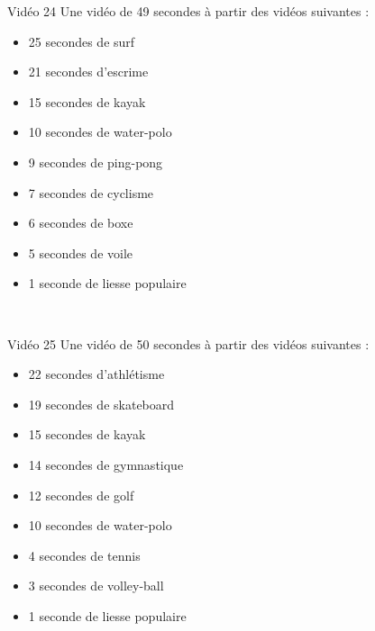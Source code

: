 \documentclass[10pt, a5paper,twoside]{article}
\begin{document}
\vfill

\begin{card}[width = \textwidth, colback = olympicyellow, colframe = olympicyellow, bottomtitle = 2mm]{Vidéo 24}
  Une vidéo de 49 secondes à partir des vidéos suivantes :
  \vspace{-1mm}\begin{itemize}
    \item 25 secondes de surf
    \item 21 secondes d'escrime
    \item 15 secondes de kayak
    \item 10 secondes de water-polo
    \item 9 secondes de ping-pong
    \item 7 secondes de cyclisme
    \item 6 secondes de boxe
    \item 5 secondes de voile
    \item 1 seconde de liesse populaire
  \end{itemize}
\end{card}

\vfill

\clearpage
~
\vfill

\begin{card}[width = \textwidth, colback = olympicyellow, colframe = olympicyellow, bottomtitle = 2mm]{Vidéo 25}
  Une vidéo de 50 secondes à partir des vidéos suivantes :
  \vspace{-1mm}\begin{itemize}
    \item 22 secondes d'athlétisme
    \item 19 secondes de skateboard
    \item 15 secondes de kayak
    \item 14 secondes de gymnastique
    \item 12 secondes de golf
    \item 10 secondes de water-polo
    \item 4 secondes de tennis
    \item 3 secondes de volley-ball
    \item 1 seconde de liesse populaire
  \end{itemize}
\end{card}

\vfill
\end{document}
